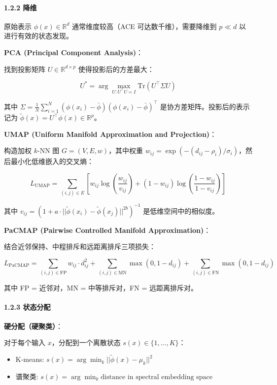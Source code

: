 \documentclass[
  12pt,
]{ctexart}
\providecommand{\tightlist}{%
  \setlength{\itemsep}{0pt}\setlength{\parskip}{0pt}}
\begin{document}
\paragraph{1.2.2 降维}\label{ux964dux7ef4}

原始表示 \(\phi(x) \in \mathbb{R}^d\) 通常维度较高（ACE
可达数千维），需要降维到 \(p \ll d\) 以进行有效的状态发现。

\textbf{PCA (Principal Component Analysis)}：

找到投影矩阵 \(U \in \mathbb{R}^{d \times p}\) 使得投影后的方差最大：

\[
U^* = \arg\max_{U: U^\top U = I} \text{Tr}(U^\top \Sigma U)
\]

其中
\(\Sigma = \frac{1}{N} \sum_{i=1}^N (\phi(x_i) - \bar{\phi})(\phi(x_i) - \bar{\phi})^\top\)
是协方差矩阵。投影后的表示记为
\(\tilde{\phi}(x) = U^\top \phi(x) \in \mathbb{R}^p\)。

\textbf{UMAP (Uniform Manifold Approximation and Projection)}：

构造加权 \(k\)-NN 图 \(G = (V, E, w)\)，其中权重
\(w_{ij} = \exp(-(d_{ij} - \rho_i)/\sigma_i)\)，然后最小化低维嵌入的交叉熵：

\[
L_{\text{UMAP}} = \sum_{(i,j) \in E} \left[ w_{ij} \log\left(\frac{w_{ij}}{v_{ij}}\right) + (1 - w_{ij}) \log\left(\frac{1 - w_{ij}}{1 - v_{ij}}\right) \right]
\]

其中
\(v_{ij} = (1 + a \cdot ||\tilde{\phi}(x_i) - \tilde{\phi}(x_j)||^{2b})^{-1}\)
是低维空间中的相似度。

\textbf{PaCMAP (Pairwise Controlled Manifold Approximation)}：

结合近邻保持、中程排斥和远距离排斥三项损失：

\[
L_{\text{PaCMAP}} = \sum_{(i,j) \in \text{FP}} w_{ij} \cdot d_{ij}^2 + \sum_{(i,j) \in \text{MN}} \max(0, 1 - d_{ij}) + \sum_{(i,j) \in \text{FN}} \max(0, 1 - d_{ij})
\]

其中 FP = 近邻对，MN = 中等排斥对，FN = 远距离排斥对。

\paragraph{1.2.3 状态分配}\label{ux72b6ux6001ux5206ux914d}

\textbf{硬分配（硬聚类）}：

对于每个输入 \(x\)，分配到一个离散状态 \(s(x) \in \{1, \dots, K\}\)：

\begin{itemize}
\tightlist
\item
  K-means: \(s(x) = \arg\min_k ||\tilde{\phi}(x) - \mu_k||^2\)
\item
  谱聚类:
  \(s(x) = \arg\min_k \text{distance in spectral embedding space}\)
\end{itemize}
\end{document}
